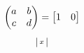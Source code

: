\documentclass{article}
\begin{document}
\[ \pmqty{a & b \\ c & d} = \bmqty{1 & 0} \]
\[ \svmqty{x} \]
\end{document}
